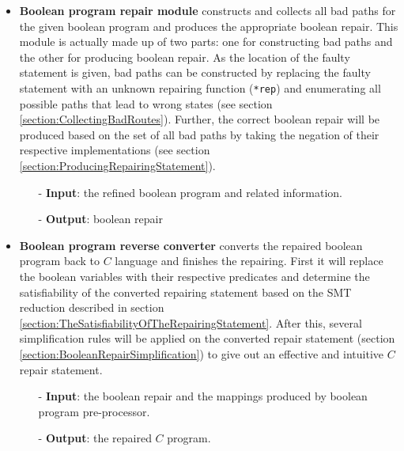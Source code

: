 \begin{itemize}
\item \textbf{Boolean program repair module} constructs and collects all bad paths for the given boolean program and produces the appropriate boolean repair.
This module is actually made up of two parts: one for constructing bad paths and the other for producing boolean repair.
As the location of the faulty statement is given, bad paths can be constructed by replacing the faulty statement with an unknown repairing function (\lstinline|*rep|) and enumerating all possible paths that lead to wrong states (see section \ref{section:CollectingBadRoutes}).
Further, the correct boolean repair will be produced based on the set of all bad paths by taking the negation of their respective implementations (see section \ref{section:ProducingRepairingStatement}).

\begin{itemize}
\item[-] \textbf{Input}: the refined boolean program and related information.
\item[-] \textbf{Output}: boolean repair
\end{itemize}

\item \textbf{Boolean program reverse converter} converts the repaired boolean program back to $C$ language and finishes the repairing. First it will replace the boolean variables with their respective predicates
and determine the satisfiability of the converted repairing statement based on the SMT reduction described in section \ref{section:TheSatisfiabilityOfTheRepairingStatement}.
After this, several simplification rules will be applied on the converted repair statement (section \ref{section:BooleanRepairSimplification}) to give out an effective and intuitive $C$ repair statement.

\begin{itemize}
\item[-] \textbf{Input}: the boolean repair and the mappings produced by boolean program pre-processor.
\item[-] \textbf{Output}: the repaired $C$ program.
\end{itemize}

\end{itemize}

